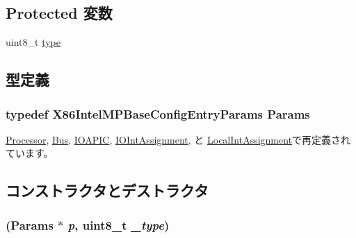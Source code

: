 \subsection*{Protected 変数}
\begin{DoxyCompactItemize}
\item 
uint8\_\-t \hyperlink{classX86ISA_1_1IntelMP_1_1BaseConfigEntry_a1d127017fb298b889f4ba24752d08b8e}{type}
\end{DoxyCompactItemize}


\subsection{型定義}
\hypertarget{classX86ISA_1_1IntelMP_1_1BaseConfigEntry_a94814126eb2e681fbf4837ed24d18616}{
\subsubsection[{Params}]{\setlength{\rightskip}{0pt plus 5cm}typedef X86IntelMPBaseConfigEntryParams {\bf Params}}}
\label{classX86ISA_1_1IntelMP_1_1BaseConfigEntry_a94814126eb2e681fbf4837ed24d18616}


\hyperlink{classX86ISA_1_1IntelMP_1_1Processor_a7e3febf745d41a8475b39c400cec69a8}{Processor}, \hyperlink{classX86ISA_1_1IntelMP_1_1Bus_a0c1ed39fdce2958466a8b166c2b32c27}{Bus}, \hyperlink{classX86ISA_1_1IntelMP_1_1IOAPIC_a438b479c81decb727ac32c221cdb909f}{IOAPIC}, \hyperlink{classX86ISA_1_1IntelMP_1_1IOIntAssignment_a1daa68f47cbaf83ea77c5f815d373bdf}{IOIntAssignment}, と \hyperlink{classX86ISA_1_1IntelMP_1_1LocalIntAssignment_a90695805b2535036d63fbf5101dc4849}{LocalIntAssignment}で再定義されています。

\subsection{コンストラクタとデストラクタ}
\hypertarget{classX86ISA_1_1IntelMP_1_1BaseConfigEntry_a94ebdf4167f2bdf065904a1f008add9a}{
\subsubsection[{BaseConfigEntry}]{ ({\bf Params} $\ast$ {\em p}, \/  uint8\_\-t {\em \_\-type})}}
\label{classX86ISA_1_1IntelMP_1_1BaseConfigEntry_a94ebdf4167f2bdf065904a1f008add9a}



